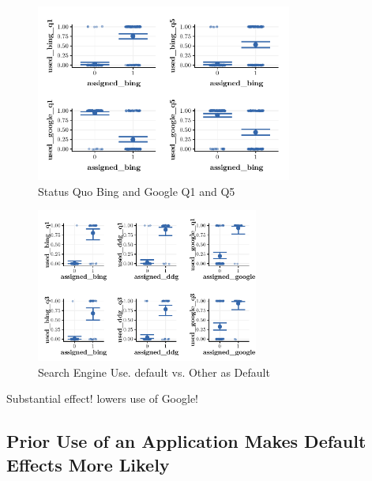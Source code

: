 \documentclass[
  11pt,
]{article}
\begin{document}
\begin{figure}

{\centering \includegraphics[width=0.75\textwidth]{Results-July25_files/figure-latex/Bing1v5-1} 

}

\caption{Status Quo Bing and Google Q1 and Q5}\label{fig:Bing1v5}
\end{figure}

\begin{figure}

{\centering \includegraphics[width=0.65\textwidth]{Results-July25_files/figure-latex/Sqsearchb-1} 

}

\caption{Search Engine Use. default vs. Other as Default}\label{fig:Sqsearchb}
\end{figure}

Substantial effect! lowers use of Google!

\hypertarget{prior-use-of-an-application-makes-default-effects-more-likely}{%
\subsection{Prior Use of an Application Makes Default Effects More Likely}\label{prior-use-of-an-application-makes-default-effects-more-likely}}
\end{document}
